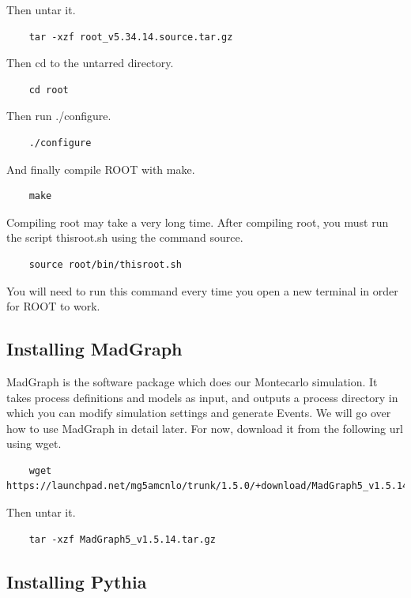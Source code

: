 \documentclass{article}
\begin{document}
Then untar it.

\begin{verbatim}
	tar -xzf root_v5.34.14.source.tar.gz
\end{verbatim}

Then cd to the untarred directory.

\begin{verbatim}
	cd root
\end{verbatim}

Then run ./configure.

\begin{verbatim}
	./configure
\end{verbatim}

And finally compile ROOT with make.

\begin{verbatim}
	make
\end{verbatim}

Compiling root may take a very long time. After compiling root, you must run the
script thisroot.sh using the command source.

\begin{verbatim}
	source root/bin/thisroot.sh
\end{verbatim}

You will need to run this command every time you open a new terminal in order for ROOT
to work.

\subsection{Installing MadGraph}

MadGraph is the software package which does our Montecarlo simulation. It takes
process definitions and models as input, and outputs a process directory in which
you can modify simulation settings and generate Events. We will go over how to use MadGraph
in detail later. For now, download it from the following url using wget.

\begin{verbatim}
	wget https://launchpad.net/mg5amcnlo/trunk/1.5.0/+download/MadGraph5_v1.5.14.tar.gz
\end{verbatim}

Then untar it.

\begin{verbatim}
	tar -xzf MadGraph5_v1.5.14.tar.gz
\end{verbatim}

\subsection{Installing Pythia}
\end{document}
